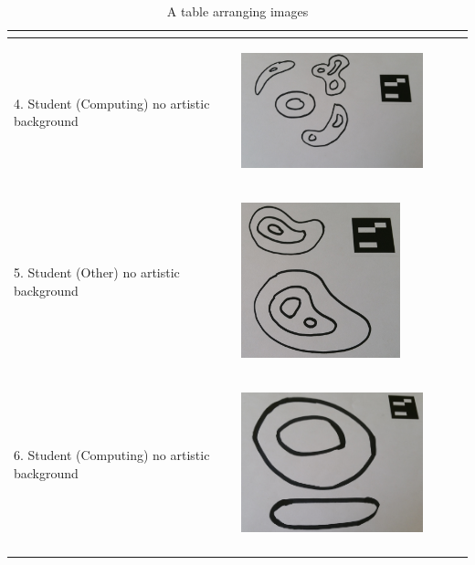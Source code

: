 \documentclass[11pt]{article}
\begin{document}
\begin{landscape}
\begin{longtable}{p{}| p{}| p{} | p{} |p{}}
							& \begin{center}\end{center} & \\
\hline
4. Student (Computing)
	no artistic background & \begin{center}\includegraphics[scale=0.5]{pics/usertesting/4.png}\end{center} 
							& \begin{center}\end{center} & \\
\hline
5. Student (Other)
	no artistic background & \begin{center}\includegraphics[scale=0.5]{pics/usertesting/5.png}\end{center} 
							& \begin{center}\end{center} & \\
6. Student (Computing)
	no artistic background & \begin{center}\includegraphics[scale=0.5]{pics/usertesting/6.png}\end{center} 
							& \begin{center}\end{center} & \\
\hline
\caption{A table arranging  images}
\label{tab:gt}
\end{longtable}
\end{landscape}
\newpage
\end{document}
